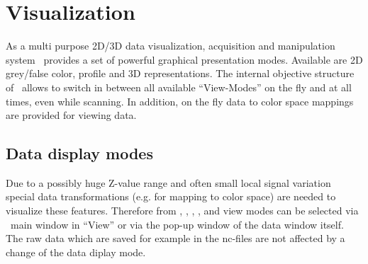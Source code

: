 

\chapter{Visualization} 
\label{ch:visual}

As a multi purpose 2D/3D data visualization, acquisition and
manipulation system \Gxsm\ provides a set of powerful graphical
presentation modes. Available are 2D grey/false color, profile and 3D
representations. The internal objective structure of \Gxsm\ allows to
switch in between all available ``View-Modes'' on the fly and at all
times, even while scanning. In addition, on the fly data to color space
mappings are provided for viewing data.

\section{Data display modes}
\label{Gxsm-VModes}

Due to a possibly huge Z-value range and often small local signal
variation special data transformations (e.g. for mapping to
color space) are needed to visualize these features. Therefore from
, , , ,
  and  view
modes can be selected via \Gxsm\ main window in ``View'' or via the
pop-up window of the data window itself. The raw data which are saved for example in the nc-files are not affected by a change of the data diplay mode.


